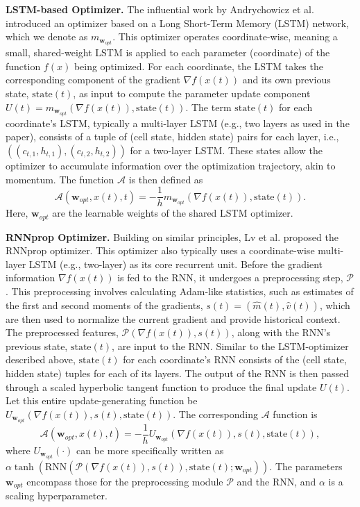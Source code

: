 \documentclass{article}
\begin{document}
\textbf{LSTM-based Optimizer.}
The influential work by Andrychowicz et al. \cite{l2o-dm} introduced an optimizer based on a Long Short-Term Memory (LSTM) network, which we denote as $m_{\mathbf{w}_{opt}}$. This optimizer operates coordinate-wise, meaning a small, shared-weight LSTM is applied to each parameter (coordinate) of the function $f(x)$ being optimized. For each coordinate, the LSTM takes the corresponding component of the gradient $\nabla f(x(t))$ and its own previous state, $\text{state}(t)$, as input to compute the parameter update component $U(t) = m_{\mathbf{w}_{opt}}(\nabla f(x(t)), \text{state}(t))$. The term $\text{state}(t)$ for each coordinate's LSTM, typically a multi-layer LSTM (e.g., two layers as used in the paper), consists of a tuple of (cell state, hidden state) pairs for each layer, i.e., $((c_{t,1}, h_{t,1}), (c_{t,2}, h_{t,2}))$ for a two-layer LSTM. These states allow the optimizer to accumulate information over the optimization trajectory, akin to momentum. The function $\mathcal{A}$ is then defined as
\begin{equation}
\mathcal{A}(\mathbf{w}_{opt}, x(t), t) = -\frac{1}{h} m_{\mathbf{w}_{opt}}(\nabla f(x(t)), \text{state}(t)).
\label{eq:lstm_optimizer}
\end{equation}
Here, $\mathbf{w}_{opt}$ are the learnable weights of the shared LSTM optimizer.

\textbf{RNNprop Optimizer.}
Building on similar principles, Lv et al. \cite{rnnprop} proposed the RNNprop optimizer. This optimizer also typically uses a coordinate-wise multi-layer LSTM (e.g., two-layer) as its core recurrent unit. Before the gradient information $\nabla f(x(t))$ is fed to the RNN, it undergoes a preprocessing step, $\mathcal{P}$. This preprocessing involves calculating Adam-like statistics, such as estimates of the first and second moments of the gradients, $s(t) = (\hat{m}(t), \hat{v}(t))$, which are then used to normalize the current gradient and provide historical context. The preprocessed features, $\mathcal{P}(\nabla f(x(t)), s(t))$, along with the RNN's previous state, $\text{state}(t)$, are input to the RNN. Similar to the LSTM-optimizer described above, $\text{state}(t)$ for each coordinate's RNN consists of the (cell state, hidden state) tuples for each of its layers. The output of the RNN is then passed through a scaled hyperbolic tangent function to produce the final update $U(t)$. Let this entire update-generating function be $U_{\mathbf{w}_{opt}}(\nabla f(x(t)), s(t), \text{state}(t))$. The corresponding $\mathcal{A}$ function is
\begin{equation}
\mathcal{A}(\mathbf{w}_{opt}, x(t), t) = -\frac{1}{h} U_{\mathbf{w}_{opt}}(\nabla f(x(t)), s(t), \text{state}(t)),
\label{eq:rnnprop_optimizer}
\end{equation}
where $U_{\mathbf{w}_{opt}}(\cdot)$ can be more specifically written as $\alpha \tanh(\text{RNN}(\mathcal{P}(\nabla f(x(t)), s(t)), \text{state}(t); \mathbf{w}_{opt}))$. The parameters $\mathbf{w}_{opt}$ encompass those for the preprocessing module $\mathcal{P}$ and the RNN, and $\alpha$ is a scaling hyperparameter.
\end{document}
